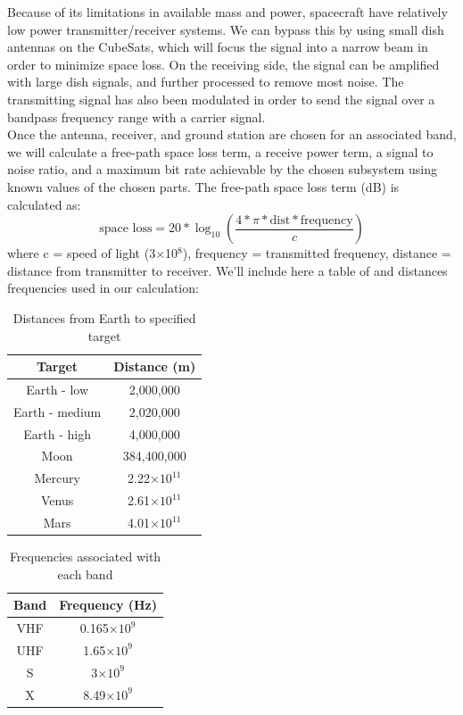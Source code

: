 \documentclass[a4, 12 pt]{article} %
\begin{document}
Because of its limitations in available mass and power, spacecraft have relatively low power transmitter/receiver systems. We can bypass this by using  small dish antennas on the CubeSats, which will focus the signal into a narrow beam in order to minimize space loss. On the receiving side, the signal can be amplified with large dish signals, and further processed to remove most noise. The transmitting signal has also been modulated in order to send the signal over a bandpass frequency range with a carrier signal.\\[3mm]
Once the antenna, receiver, and ground station are chosen for an associated band, we will calculate a free-path space loss term, a receive power term, a signal to noise ratio, and a maximum bit rate achievable by the chosen subsystem using known values of the chosen parts. The free-path space loss term (dB) is calculated as:
\begin{equation} \text{space loss} = 20*\log_{10}\left(\dfrac{4*\pi*\text{dist}*\text{frequency}}{c}\right)\end{equation}
where c = speed of light (3$\times$10$^8$), frequency = transmitted frequency, distance = distance from transmitter to receiver. We'll include here a table of and distances frequencies used in our calculation:
\begin{table}[H]
\caption{Distances from Earth to specified target}
\begin{center}
\begin{tabular}{|c|c|}
\hline
Target & Distance (m)\\
\hline
Earth - low & 2,000,000\\
Earth - medium & 2,020,000\\
Earth - high & 4,000,000 \\
Moon & 384,400,000\\
Mercury &  2.22$\times10^{11}$\\
Venus & 2.61$\times10^{11}$\\
Mars & 4.01$\times10^{11}$\\
\hline
\end{tabular}
\end{center}
\label{default}
\end{table}%
\begin{table}[H]
\caption{Frequencies associated with each band}
\begin{center}
\begin{tabular}{|c|c|}
\hline
Band & Frequency (Hz)\\
\hline
VHF & 0.165$\times10^{9}$\\
UHF & 1.65$\times10^{9}$\\
S & 3$\times10^{9}$\\
X & 8.49$\times10^{9}$\\
\hline
\end{tabular}
\end{center}
\label{default}
\end{table}%
\end{document}
